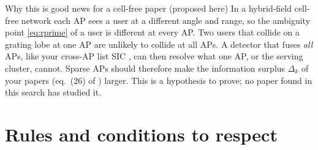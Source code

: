 \documentclass[11pt]{article}
\begin{document}
\begin{ideabox}{Why this is good news for a cell-free paper (proposed here)}
In a hybrid-field cell-free network each AP sees a user at a different angle and range, so the ambiguity point \eqref{eq:rprime} of a user is different at every AP. Two users that collide on a grating lobe at one AP are unlikely to collide at all APs. A detector that fuses \emph{all} APs, like your cross-AP list SIC \cite{haider2026icassp,haider2026vtc}, can then resolve what one AP, or the serving cluster, cannot. Sparse APs should therefore make the information surplus $\Delta_k$ of your papers (eq.~(26) of \cite{haider2026vtc}) larger. This is a hypothesis to prove; no paper found in this search has studied it.
\end{ideabox}

\section{Rules and conditions to respect}
\label{sec:rules}
\end{document}
